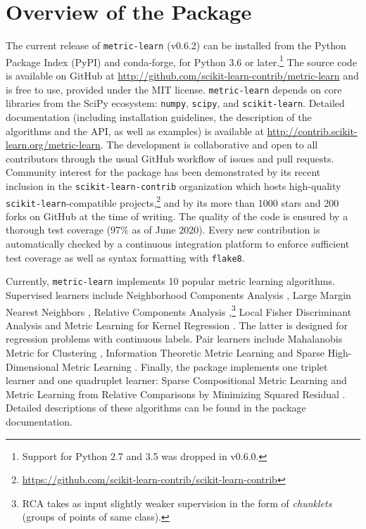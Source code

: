 \documentclass[twoside,11pt]{article}
\newcommand{\aurelien}[1]{\todo[inline,caption={},color=orange!40]{{\it Aurelien:~}#1}}
\begin{document}
\section{Overview of the Package}

The current release of \texttt{metric-learn} (v0.6.2) can be installed from the Python Package Index (PyPI) and conda-forge, for Python 3.6 or later.\footnote{Support for Python 2.7 and 3.5 was dropped in v0.6.0.}
The source code is available on GitHub at \url{http://github.com/scikit-learn-contrib/metric-learn} and is free to use, provided under the MIT license. 
\texttt{metric-learn} depends on core libraries from the SciPy ecosystem: \texttt{numpy}, \texttt{scipy}, and \texttt{scikit-learn}.
Detailed documentation (including installation guidelines, the description of the algorithms and the API, as well as examples) is available at \url{http://contrib.scikit-learn.org/metric-learn}.
The development is collaborative and open to all contributors through the usual GitHub workflow of issues and pull requests.
Community interest for the package has been demonstrated by its recent inclusion in the \texttt{scikit-learn-contrib} organization which hosts high-quality \texttt{scikit-learn}-compatible projects,\footnote{\url{https://github.com/scikit-learn-contrib/scikit-learn-contrib}} and by its more than 1000 stars and 200 forks on GitHub at the time of writing.
The quality of the code is ensured by a thorough test coverage (97\% as of June 2020).
Every new contribution is automatically checked by a continuous integration platform to enforce sufficient test coverage as well as syntax formatting with \texttt{flake8}. %

Currently, \texttt{metric-learn} implements 10 popular metric learning algorithms.
Supervised learners include Neighborhood Components Analysis \citep[NCA,][]{Goldberger04}, Large Margin Nearest Neighbors \citep[LMNN,][]{Weinberger09}, Relative Components Analysis \citep[RCA,][]{Shental02},\footnote{RCA takes as input slightly weaker supervision in the form of \emph{chunklets} (groups of points of same class).} Local Fisher Discriminant Analysis \citep[LFDA,][]{Sugiyama07} and Metric Learning for Kernel Regression \citep[MLKR,][]{Weinberger07}.
The latter is designed for regression problems with continuous labels.
Pair learners include Mahalanobis Metric for Clustering \citep[MMC,][]{Xing2002a}, Information Theoretic Metric Learning \citep[ITML,][]{Davis07} and Sparse High-Dimensional Metric Learning \citep[SDML,][]{Qi09}.
Finally, the package implements one triplet learner and one quadruplet learner: Sparse Compositional Metric Learning \citep[SCML,][]{Shi15} and Metric Learning from Relative Comparisons by Minimizing Squared Residual \citep[LSML,][]{Liu12}.
Detailed descriptions of these algorithms can be found in the package documentation.
\end{document}

